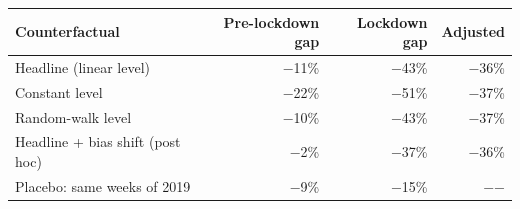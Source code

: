\begin{tabular}{|l|r|r|r|}
\hline
\textbf{Counterfactual} & \textbf{Pre-lockdown gap} & \textbf{Lockdown gap} & \textbf{Adjusted} \\\hline
Headline (linear level) & $-$11\% & $-$43\% & $-$36\% \\\hline
Constant level & $-$22\% & $-$51\% & $-$37\% \\\hline
Random-walk level & $-$10\% & $-$43\% & $-$37\% \\\hline
Headline + bias shift (post hoc) & $-$2\% & $-$37\% & $-$36\% \\\hline
Placebo: same weeks of 2019 & $-$9\% & $-$15\% & $-$$-$ \\\hline
\end{tabular}

